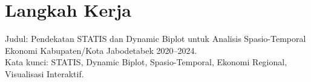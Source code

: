 \documentclass[a4paper]{article}
\theoremstyle{definition} %
\begin{document}
\newpage
\section{Langkah Kerja}
\bigskip

\noindent
Judul: Pendekatan STATIS dan Dynamic Biplot untuk Analisis Spasio-Temporal Ekonomi Kabupaten/Kota Jabodetabek 2020--2024. \\
Kata kunci: STATIS, Dynamic Biplot, Spasio-Temporal, Ekonomi Regional, Visualisasi Interaktif.

\bigskip
\end{document}
